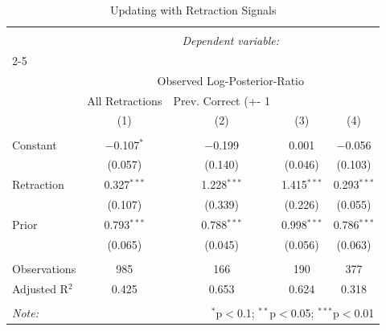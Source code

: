 
\begin{table}[!htbp] \centering 
  \caption{Updating with Retraction Signals} 
  \label{} 
\begin{tabular}{@{\extracolsep{5pt}}lcccc} 
\\[-1.8ex]\hline 
\hline \\[-1.8ex] 
 & \multicolumn{4}{c}{\textit{Dependent variable:}} \\ 
\cline{2-5} 
\\[-1.8ex] & \multicolumn{4}{c}{Observed Log-Posterior-Ratio} \\ 
 & All Retractions & Prev. Correct (+- 1%
\\[-1.8ex] & (1) & (2) & (3) & (4)\\ 
\hline \\[-1.8ex] 
 Constant & $-$0.107$^{*}$ & $-$0.199 & 0.001 & $-$0.056 \\ 
  & (0.057) & (0.140) & (0.046) & (0.103) \\ 
  Retraction & 0.327$^{***}$ & 1.228$^{***}$ & 1.415$^{***}$ & 0.293$^{***}$ \\ 
  & (0.107) & (0.339) & (0.226) & (0.055) \\ 
  Prior & 0.793$^{***}$ & 0.788$^{***}$ & 0.998$^{***}$ & 0.786$^{***}$ \\ 
  & (0.065) & (0.045) & (0.056) & (0.063) \\ 
 \hline \\[-1.8ex] 
Observations & 985 & 166 & 190 & 377 \\ 
Adjusted R$^{2}$ & 0.425 & 0.653 & 0.624 & 0.318 \\ 
\hline 
\hline \\[-1.8ex] 
\textit{Note:}  & \multicolumn{4}{r}{$^{*}$p$<$0.1; $^{**}$p$<$0.05; $^{***}$p$<$0.01} \\ 
\end{tabular} 
\end{table} 
